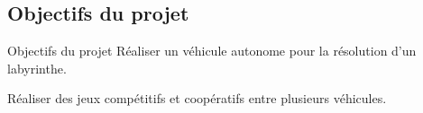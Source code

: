 \documentclass{beamer}
\begin{document}
\subsection{Objectifs du projet}
\begin{frame}{Objectifs du projet}
Réaliser un véhicule autonome pour la résolution d'un labyrinthe. 

\vspace{5mm}

\begin{center}
    
\begin{table}[H]
    \caption{Objectifs à réaliser pour les trois parties essentielles}
\end{table}

\end{center}


Réaliser des jeux compétitifs et coopératifs entre plusieurs véhicules.
\end{frame}
\end{document}
